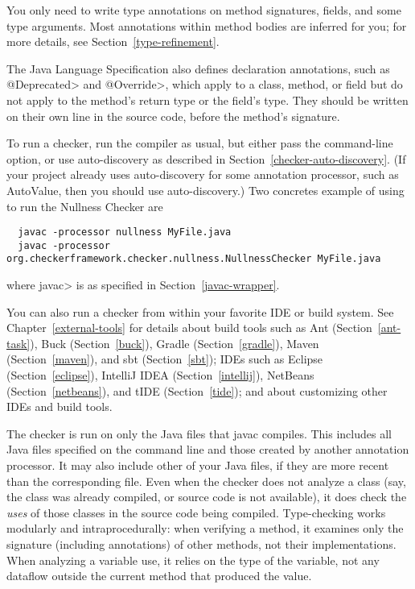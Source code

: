 You only need to write type annotations on method signatures, fields, and some type arguments.
Most annotations within method bodies are inferred for you; for more details,
see  Section~\ref{type-refinement}.

The Java Language Specification also defines
declaration annotations, such as \<@Deprecated> and \<@Override>, which apply
to a class, method, or field but do not apply to the method's return type
or the field's type.  They should be written on their own line in the
source code, before the method's signature.



To run a checker, run the compiler  as usual,
but either pass the  command-line
option, or use auto-discovery as described in
Section~\ref{checker-auto-discovery}.
(If your project already uses auto-discovery for some annotation processor,
such as AutoValue, then you should use auto-discovery.)
Two concretes example of using  to run the Nullness Checker are

\begin{Verbatim}
  javac -processor nullness MyFile.java
  javac -processor org.checkerframework.checker.nullness.NullnessChecker MyFile.java
\end{Verbatim}

\noindent
where \<javac> is as specified in Section~\ref{javac-wrapper}.

You can also run a checker from within your favorite IDE or build system.  See
Chapter~\ref{external-tools} for details about build tools such as
Ant (Section~\ref{ant-task}),
Buck (Section~\ref{buck}),
Gradle (Section~\ref{gradle}),
Maven (Section~\ref{maven}), and
sbt (Section~\ref{sbt});
IDEs such as
Eclipse (Section~\ref{eclipse}),
IntelliJ IDEA (Section~\ref{intellij}),
NetBeans (Section~\ref{netbeans}),
and
tIDE (Section~\ref{tide});
and about customizing other IDEs and build tools.

The checker is run on only the Java files that javac compiles.
This includes all Java files specified on the command line and those
created by another annotation processor.  It may also include other of
your Java files, if they are more recent than the corresponding  file.
Even when the checker does not analyze a class (say, the class was
already compiled, or source code is not available), it does check
the \emph{uses} of those classes in the source code being compiled.
Type-checking works modularly and intraprocedurally:  when verifying a
method, it examines only the signature (including annotations) of other
methods, not their implementations.  When analyzing a variable use, it
relies on the type of the variable, not any dataflow outside the current
method that produced the value.

